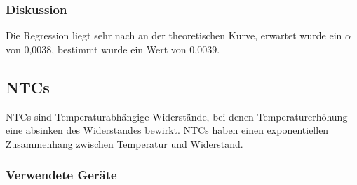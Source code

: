 \documentclass[12pt,a4paper]{article}
\begin{document}
\subsubsection*{Diskussion}

Die Regression liegt sehr nach an der theoretischen Kurve, erwartet wurde ein $\alpha$ von 0,0038, bestimmt wurde ein Wert von 0,0039.









\subsection{NTCs}

NTCs sind Temperaturabhängige Widerstände, bei denen Temperaturerhöhung eine absinken des Widerstandes bewirkt. NTCs haben einen exponentiellen Zusammenhang zwischen Temperatur und Widerstand.

\subsubsection*{Verwendete Geräte}
\end{document}
